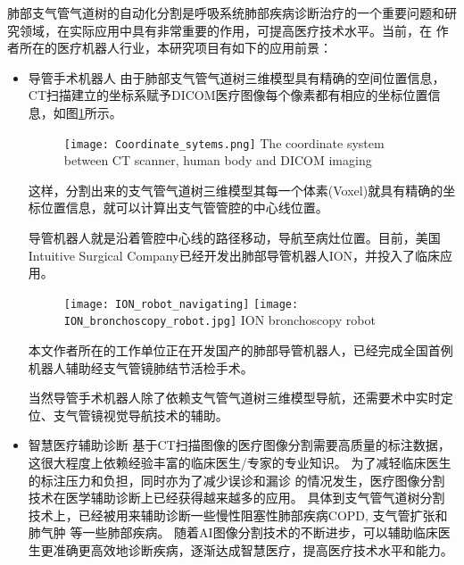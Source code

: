 肺部支气管气道树的自动化分割是呼吸系统肺部疾病诊断治疗的一个重要问题和研究领域，在实际应用中具有非常重要的作用，可提高医疗技术水平。当前，在
作者所在的医疗机器人行业，本研究项目有如下的应用前景：
\begin{itemize}
	\item {\heiti 导管手术机器人 }
	由于肺部支气管气道树三维模型具有精确的空间位置信息，CT扫描建立的坐标系赋予DICOM医疗图像每个像素都有相应的坐标位置信息，如图\ref{fig:coordinate}所示。
	\begin{figure}[!htp]
		\centering
		\texttt{[image: Coordinate\_sytems.png]}
			{The coordinate system between CT scanner, human body and DICOM imaging}
		\label{fig:coordinate}
	\end{figure}
	这样，分割出来的支气管气道树三维模型其每一个体素(Voxel)就具有精确的坐标位置信息，就可以计算出支气管管腔的中心线位置。
	
	导管机器人就是沿着管腔中心线的路径移动，导航至病灶位置。目前，美国Intuitive Surgical Company已经开发出肺部导管机器人ION，并投入了临床应用。
	\begin{figure}[!htp]
		\centering
		\texttt{[image: ION\_robot\_navigating]}
		\hspace{2mm}
		\texttt{[image: ION\_bronchoscopy\_robot.jpg]}
			{ION bronchoscopy robot}
		\label{fig:ION_robot}
	\end{figure}
	
	本文作者所在的工作单位正在开发国产的肺部导管机器人，已经完成全国首例机器人辅助经支气管镜肺结节活检手术。
	
	当然导管手术机器人除了依赖支气管气道树三维模型导航，还需要术中实时定位、支气管镜视觉导航技术的辅助。
	
	
	\item {\heiti 智慧医疗辅助诊断}
	基于CT扫描图像的医疗图像分割需要高质量的标注数据，这很大程度上依赖经验丰富的临床医生/专家的专业知识。 为了减轻临床医生的标注压力和负担，同时亦为了减少误诊和漏诊
	的情况发生，医疗图像分割技术在医学辅助诊断上已经获得越来越多的应用。 具体到支气管气道树分割技术上，已经被用来辅助诊断一些慢性阻塞性肺部疾病COPD, 支气管扩张和肺气肿
	等一些肺部疾病。 随着AI图像分割技术的不断进步，可以辅助临床医生更准确更高效地诊断疾病，逐渐达成智慧医疗，提高医疗技术水平和能力。
\end{itemize}



